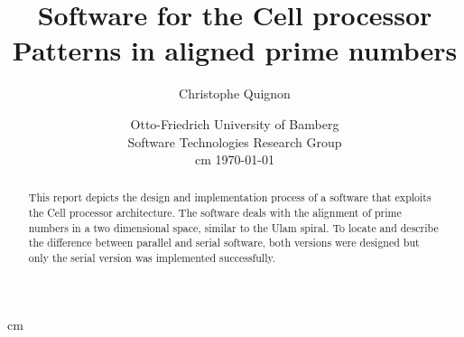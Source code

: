 \documentclass[a4paper]{article}
\begin{document}
\begin{titlepage}


\title{%
	\Huge Software for the Cell processor\bigskip\\ \Large Patterns in aligned prime numbers\\}
\author{Christophe Quignon}
\date{Otto-Friedrich University of Bamberg\\
Software Technologies Research Group\\
 cm	
\today}

\maketitle
{} cm
\begin{abstract}
This report depicts the design and implementation process of a software that exploits the Cell processor architecture. The software deals with the alignment of prime numbers in a two dimensional space, similar to the Ulam spiral. To locate and describe the difference between parallel and serial software, both versions were designed but only the serial version was implemented successfully.
\end{abstract}
\thispagestyle{empty}
\newpage
\tableofcontents
{}
\newpage
\listoffigures
\newpage
\end{titlepage}






%

\newpage



   
\end{document}
